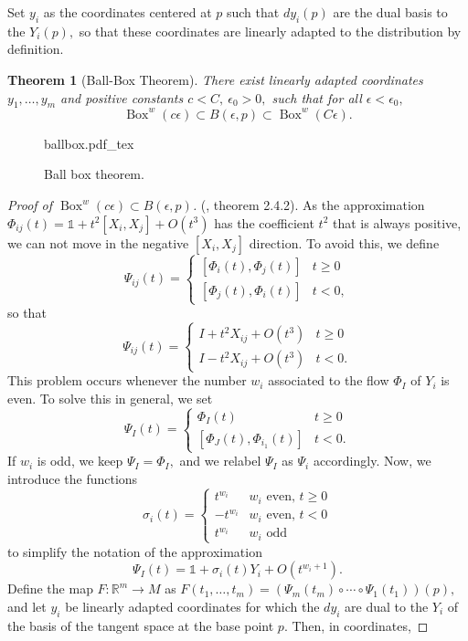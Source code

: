 \documentclass[12pt, letterpaper, reqno]{amsart}
\newcommand{\incfig}[2][1]{%
    \def\svgwidth{#1\columnwidth}
    {#2.pdf_tex}
}
\theoremstyle{definition}
\theoremstyle{plain}
\newtheorem{thm}{Theorem}
\theoremstyle{remark}
\begin{document}
Set $ y_i $ as the coordinates centered at $ p $ such that $ dy_i(p) $ are the dual basis to the $ Y_i(p), $ so that these coordinates are linearly adapted to the distribution by definition.

\begin{thm}[Ball-Box Theorem]
	There exist linearly adapted coordinates $ y_1,\dots,y_m $ and positive constants $ c<C, \ \epsilon_0>0, $ such that for all $ \epsilon<\epsilon_0, $ 
	$$ \operatorname{Box}^w(c\epsilon)\subset B(\epsilon, p)\subset \operatorname{Box}^w(C\epsilon).    $$ 
\end{thm}
\begin{figure}[ht]
    \centering
    \incfig{ballbox}
    \caption{Ball box theorem.}
    \label{fig:ballbox}
\end{figure}
\begin{proof}[Proof of $\operatorname{Box}^w(c\epsilon)\subset B(\epsilon, p)$] (\cite{montgomery2002tour}, theorem 2.4.2). As the approximation $ \Phi_{ij}(t)= \mathbb{1} + t^2 \left[ X_i,X_j \right] + O(t^3)$ has the coefficient $ t^2 $ that is always positive, we can not move in the negative $ [X_i,X_j] $ direction. To avoid this, we define 
	$$ \Psi_{i j}(t)=\left\{\begin{array}{ll}{\left[\Phi_{i}(t), \Phi_{j}(t)\right]} & t \geq 0 \\ {\left[\Phi_{j}(t), \Phi_{i}(t)\right]} & t<0,\end{array}\right. $$ 
	so that
	$$\Psi_{i j}(t)=\left\{\begin{array}{ll}I+t^{2} X_{i j}+O\left(t^{3}\right) & t \geq 0 \\ I-t^{2} X_{i j}+O\left(t^{3}\right) & t<0.\end{array}\right.$$
This problem occurs whenever the number $ w_i $ associated to the flow $ \Phi_I $ of $ Y_i $ is even. To solve this in general, we set
$$\Psi_{I}(t)=\left\{\begin{array}{ll}
\Phi_{I}(t) & t \geq 0 \\
{\left[\Phi_{J}(t), \Phi_{i_{1}}(t)\right]} & t<0.
\end{array}\right.$$
If $ w_i $ is odd, we keep $ \Psi_I=\Phi_I, $ and we relabel $ \Psi_I $ as $ \Psi_i $ accordingly. Now, we introduce the functions
$$\sigma_{i}(t)=\left\{\begin{array}{ll}
t^{w_{i}} & w_{i} \text { even, } t \geq 0 \\
-t^{w_{i}} & w_{i} \text { even, } t<0 \\
t^{w_{i}} & w_{i} \text { odd }
\end{array}\right.
$$
to simplify the notation of the approximation
$$ \Psi_I(t)= \mathbb{1}+ \sigma_i(t) Y_i + O(t^{w_i+1}). $$ 
Define the map $ F: \mathbb{R}^m \rightarrow {M} $ as $ F(t_1,\dots,t_m) = \left( \Psi_m(t_m) \circ \cdots \circ \Psi_1(t_1)\right)(p), $ and let $ y_i $ be linearly adapted coordinates for which the $ dy_i $ are dual to the $ Y_i $ of the basis of the tangent space at the base point $ p. $ Then, in coordinates,


\end{proof}
\end{document}
